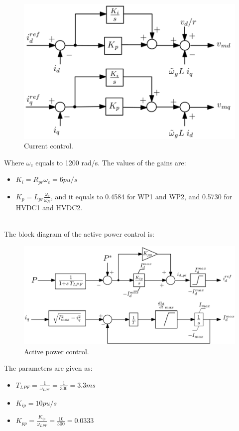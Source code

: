 \documentclass{report}
\begin{document}
\begin{figure}[H]
    \centering
    \includegraphics[scale = 0.28]{Figure_converter/DQ_current_control.png}
    \caption{Current control.}
    \label{fig:current_control}
\end{figure}
Where $\omega_c$ equals to 1200 rad/s. The values of the gains are:
\begin{itemize}
    \item $K_i = R_{pr}\omega_c = 6 pu/s$
    \item $K_p = L_{pr} \frac{\omega_c}{\omega_N}$, and it equals to 0.4584 for WP1 and WP2, and 0.5730 for HVDC1 and HVDC2.
\end{itemize}
~\\
The block diagram of the active power control is:
\begin{figure}[H]
    \centering
    \includegraphics[scale = 0.4]{Figure_converter/active_power_control.png}
    \caption{Active power control.}
    \label{fig:active_power_control}
\end{figure}
The parameters are given as:
\begin{itemize}
    \item $T_{LPF} = \frac{1}{\omega_{LPF}} = \frac{1}{300} = 3.3 ms$
    \item $K_{ip} = 10 pu/s$
    \item $K_{pp} = \frac{K_{ip}}{\omega_{LPF}} = \frac{10}{300} = 0.0333$
\end{itemize}
\end{document}
